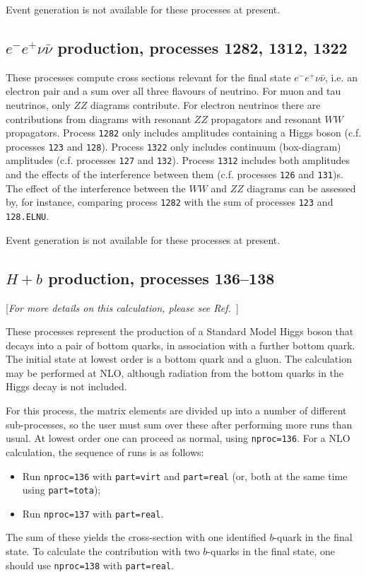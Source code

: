 Event generation is not available for these processes at present.

\subsection{$e^- e^+ \nu \bar \nu$ production, processes 1282, 1312, 1322}
These processes compute cross sections relevant for the final state
$e^- e^+ \nu \bar \nu$, i.e. an electron pair and a sum over all three
flavours of neutrino.  For muon and tau neutrinos, only $ZZ$ diagrams
contribute.  For electron neutrinos there are contributions from diagrams
with resonant $ZZ$ propagators and resonant $WW$ propagators.  Process
{\tt 1282} only includes amplitudes containing a Higgs boson (c.f. processes
{\tt 123} and {\tt 128}). Process
{\tt 1322} only includes continuum (box-diagram) amplitudes (c.f. processes
{\tt 127} and {\tt 132}). Process
{\tt 1312} includes both amplitudes and the effects of the interference
between them (c.f. processes {\tt 126} and {\tt 131})s.
The effect of the interference between the $WW$ and $ZZ$ diagrams can be assessed
by, for instance, comparing process {\tt 1282} with the sum of processes
{\tt 123} and {\tt 128.ELNU}.

Event generation is not available for these processes at present.


\subsection{$H+b$ production, processes 136--138}
\label{subsec:Hb}

\begin{center}
[{\it For more details on this calculation, please see Ref.~\cite{Campbell:2002zm}}]
\end{center}

These processes represent the production of a Standard Model Higgs
boson that decays into a pair of bottom quarks,
in association with a further bottom quark. The initial state at lowest order
is a bottom quark and a gluon.
The calculation may be performed at NLO, although radiation from the
bottom quarks in the Higgs decay is not included.

For this process, the matrix elements are divided up into a number of
different sub-processes, so the user must sum over these after performing
more runs than usual. At lowest order one can proceed as normal, using
{\tt nproc=136}. For a NLO calculation, the sequence of runs is as follows:
\begin{itemize}
\item Run {\tt nproc=136} with {\tt part=virt} and {\tt part=real} (or, both
at the same time using {\tt part=tota});
\item Run {\tt nproc=137} with {\tt part=real}.
\end{itemize}
The sum of these yields the cross-section with one identified $b$-quark in
the final state. To calculate the contribution with two $b$-quarks in the
final state, one should use {\tt nproc=138} with {\tt part=real}.

